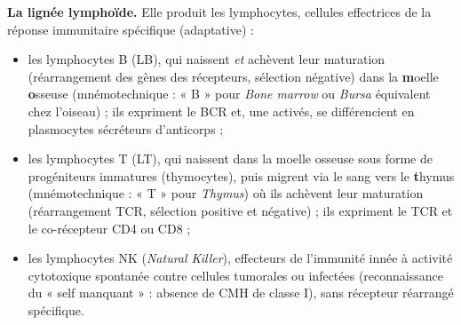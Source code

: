 \documentclass[11pt]{article}
\newcommand{\cle}[1]{{\popxbold\color{popdark}#1}}
\begin{document}
\textbf{La lignée lymphoïde.} Elle produit les \cle{lymphocytes}, cellules effectrices de la réponse immunitaire spécifique (adaptative) :
\begin{itemize}
\item les \cle{lymphocytes B} (LB), qui naissent \emph{et} achèvent leur maturation (réarrangement des gènes des récepteurs, sélection négative) dans la \textbf{m}oelle \textbf{o}sseuse (mnémotechnique : « B » pour \emph{Bone marrow} ou \emph{Bursa} équivalent chez l'oiseau) ; ils expriment le BCR et, une activés, se différencient en plasmocytes sécréteurs d'anticorps ;
\item les \cle{lymphocytes T} (LT), qui naissent dans la moelle osseuse sous forme de progéniteurs immatures (thymocytes), puis migrent via le sang vers le \textbf{t}hymus (mnémotechnique : « T » pour \emph{Thymus}) où ils achèvent leur maturation (réarrangement TCR, sélection positive et négative) ; ils expriment le TCR et le co-récepteur CD4 ou CD8 ;
\item les lymphocytes \cle{NK} (\emph{Natural Killer}), effecteurs de l'immunité innée à activité cytotoxique spontanée contre cellules tumorales ou infectées (reconnaissance du « self manquant » : absence de CMH de classe I), sans récepteur réarrangé spécifique.
\end{itemize}
\end{document}
